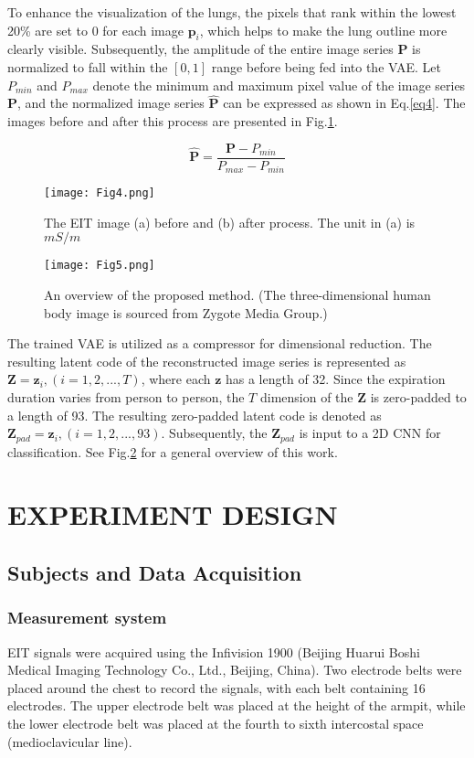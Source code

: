 \documentclass[journal,twoside,web]{ieeecolor}
\begin{document}
To enhance the visualization of the lungs, the pixels that rank within the lowest 20\% are set to 0 for each image $\bm p_i$, which helps to make the lung outline more clearly visible. Subsequently, the amplitude of the entire image series $\bm P$ is normalized to fall within the $[0,1]$ range before being fed into the VAE. Let $P_{min}$ and $P_{max}$ denote the minimum and maximum pixel value of the image series $\bm P$, and the normalized image series $\hat {\bm P}$ can be expressed as shown in Eq.\ref{eq4}. The images before and after this process are presented in Fig.\ref{preprocess}.

\begin{equation}\label{eq4}
	\hat {\bm P} = \frac{\bm P - P_{min}}{P_{max} - P_{min}}
\end{equation}


\begin{figure}[!h] 
	\centering
	\texttt{[image: Fig4.png]}
	\caption{The EIT image (a) before and (b) after process. The unit in (a) is $mS/m$}
	\label{preprocess}
\end{figure}

\begin{figure*}[!h] 
	\centering
	\texttt{[image: Fig5.png]}
	\caption{An overview of the proposed method. (The three-dimensional human body image is sourced from Zygote Media Group.)}
	\label{overview}
\end{figure*}

The trained VAE is utilized as a compressor for dimensional reduction. The resulting latent code of the reconstructed image series is represented as $\bm Z = {\bm z_{i}, (i=1,2,...,T)}$, where each $\bm z$ has a length of 32. Since the expiration duration varies from person to person, the $T$ dimension of the $\bm Z$ is zero-padded to a length of 93. The resulting zero-padded latent code is denoted as $\bm Z_{pad} = {\bm z_{i}, (i=1,2,...,93)}$. Subsequently, the $\bm Z_{pad}$ is input to a 2D CNN for classification. See Fig.\ref{overview} for a general overview of this work.

\section{EXPERIMENT DESIGN}
\label{exp}
\subsection{Subjects and Data Acquisition}
\subsubsection{Measurement system}
EIT signals were acquired using the Infivision 1900 (Beijing Huarui Boshi Medical Imaging Technology Co., Ltd., Beijing, China). Two electrode belts were placed around the chest to record the signals, with each belt containing 16 electrodes. The upper electrode belt was placed at the height of the armpit, while the lower electrode belt was placed at the fourth to sixth intercostal space (medioclavicular line).
\end{document}
